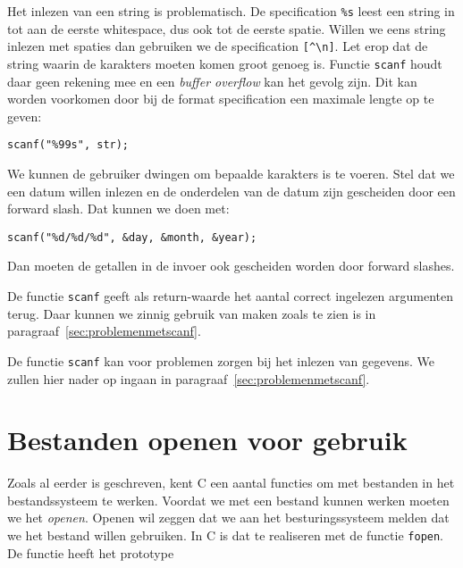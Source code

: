 Het inlezen van een string is problematisch. De specification \texttt{\%s} leest een string in tot aan de eerste whitespace, dus ook tot de eerste spatie. Willen we eens string inlezen met spaties dan gebruiken we de specification \texttt{[\textasciicircum\textbackslash n]}. Let erop dat de string waarin de karakters moeten komen groot genoeg is. Functie \texttt{scanf} houdt daar geen rekening mee en een \textsl{buffer overflow} kan het gevolg zijn. Dit kan worden voorkomen door bij de format specification een maximale lengte op te geven:

\hspace*{1em}\texttt{scanf("\%99s", str);}

We kunnen de gebruiker dwingen om bepaalde karakters is te voeren. Stel dat we een datum willen inlezen en de onderdelen van de datum zijn gescheiden door een forward slash. Dat kunnen we doen met:

\hspace*{1em}\texttt{scanf("\%d/\%d/\%d", \&day, \&month, \&year);}

Dan moeten de getallen in de invoer ook gescheiden worden door forward slashes.

De functie \texttt{scanf} geeft als return-waarde het aantal correct ingelezen argumenten terug. Daar kunnen we zinnig gebruik van maken zoals te zien is in paragraaf~\ref{sec:problemenmetscanf}.

De functie \texttt{scanf} kan voor problemen zorgen bij het inlezen van gegevens. We zullen hier nader op ingaan in paragraaf~\ref{sec:problemenmetscanf}.


\section{Bestanden openen voor gebruik}
Zoals al eerder is geschreven, kent C een aantal functies om met bestanden in het bestandssysteem te werken. Voordat we met een bestand kunnen werken moeten we het \textsl{openen}. Openen wil zeggen dat we aan het besturingssysteem melden dat we het bestand willen gebruiken. In C is dat te realiseren met de functie \texttt{fopen}. De functie heeft het prototype

